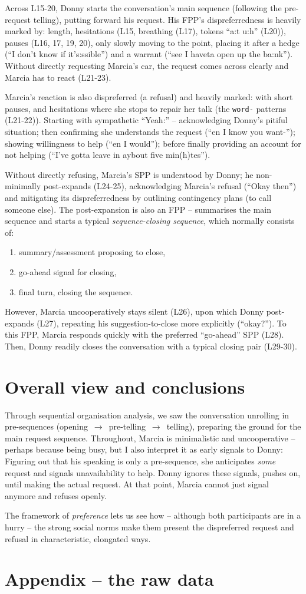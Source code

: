 \documentclass[11pt]{article}
\begin{document}
{	Across L15-20, Donny starts the conversation's main sequence (following the pre-request telling), putting forward his request. His FPP's dispreferredness is heavily marked by: length, hesitations (L15, breathing (L17), tokens ``a:t u:h'' (L20)), pauses (L16, 17, 19, 20), only slowly moving to the point, placing it after a hedge (``I don't know if it's:ssible'') and a warrant (``see I haveta open up the ba:nk''). Without directly requesting Marcia's car, the request comes across clearly and Marcia has to react (L21-23).

	Marcia's reaction is also dispreferred (a refusal) and heavily marked: with short pauses, and hesitations where she stops to repair her talk (the \verb|word-| patterns (L21-22)). Starting with sympathetic ``Yeah:'' -- acknowledging Donny's pitiful situation; then confirming she understands the request (``en I know you want-''); showing willingness to help (``en I would''); before finally providing an account for not helping (``I've gotta leave in aybout five min(h)tes'').

	Without directly refusing, Marcia's SPP is understood by Donny; he non-minimally post-expands (L24-25), acknowledging Marcia's refusal (``Okay then'') and mitigating its dispreferredness by outlining contingency plans (to call someone else). The post-expansion is also an FPP -- summarises the main sequence and starts a typical \textit{sequence-closing sequence}, which \citep[p.~168]{Liddicoat_2007} normally consists of:
	\begin{enumerate}
		\item summary/assessment proposing to close,
		\item go-ahead signal for closing,
		\item final turn, closing the sequence.
	\end{enumerate}
	However, Marcia uncooperatively stays silent (L26), upon which Donny post-expands (L27), repeating his suggestion-to-close more explicitly (``okay?''). To this FPP, Marcia responds quickly with the preferred ``go-ahead'' SPP (L28). Then, Donny readily closes the conversation with a typical closing pair (L29-30).
}

\section*{Overall view and conclusions}{
	Through sequential organisation analysis, we saw the conversation unrolling in pre-sequences (opening~$\rightarrow$~pre-telling~$\rightarrow$~telling), preparing the ground for the main request sequence.
	Throughout, Marcia is minimalistic and uncooperative -- perhaps because being busy, but I also interpret it as early signals to Donny: 
	Figuring out that his speaking is only a pre-sequence, she anticipates \textit{some} request and signals unavailability to help.
	Donny ignores these signals, pushes on, until making the actual request.
	At that point, Marcia cannot just signal anymore and refuses openly.

	The framework of \textit{preference} lets us see how -- although both participants are in a hurry -- the strong social norms make them present the dispreferred request and refusal in characteristic, elongated ways.
}




\clearpage
\section*{Appendix -- the raw data}{
	
}
\end{document}

